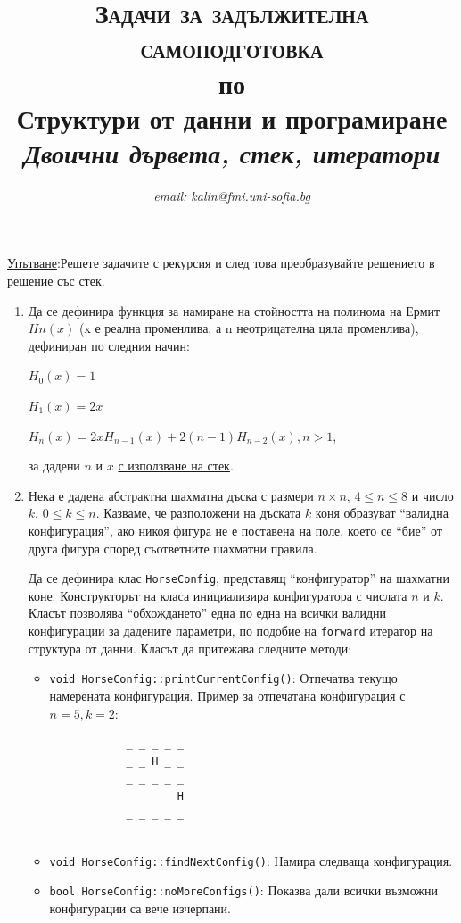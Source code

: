 \documentclass[12pt,a4paper]{article}
\author{\textit{email: kalin@fmi.uni-sofia.bg}}
\title{\textsc{Задачи за задължителна самоподготовка} \\
по \\
Структури от данни и програмиране\\
\textit{Двоични дървета, стек, итератори}}
\begin{document}
\maketitle

 \underline{Упътване}:Решете задачите с рекурсия и след това преобразувайте решението в решение със стек.



\begin{enumerate}

	\item Да се дефинира функция за намиране на стойността на полинома на Ермит $Hn(x)$ (x е реална променлива, а n неотрицателна цяла променлива), дефиниран по следния начин:

	$H_0(x)=1$

	$H_1(x)=2x$

	$H_n(x)=2xH_{n-1}(x)+2(n-1)H_{n-2}(x), n>1$,

	за дадени $n$ и $x$ \underline{с използване на стек}.


	\item Нека е дадена абстрактна шахматна дъска с размери $n \times n$, $4 \le n \le 8$ и число $k$, $0 \le k \le n$. Казваме, че разположени на дъската  $k$ коня образуват ``валидна конфигурация'', ако никоя фигура не е поставена на поле, което се ``бие'' от друга фигура според съответните шахматни правила. 

	Да се дефинира клас \texttt{HorseConfig}, представящ ``конфигуратор'' на шахматни коне. Конструкторът на класа инициализира конфигуратора с числата $n$ и $k$. Класът позволява ``обхождането'' една по една на всички валидни конфигурации за дадените параметри, по подобие на \texttt{forward} итератор на структура от данни. Класът да притежава следните методи:

	\begin{itemize}
		\item \texttt{void HorseConfig::printCurrentConfig()}: Отпечатва текущо намерената конфигурация.
			Пример за отпечатана конфигурация с $n=5, k=2$:
			\begin{verbatim}
			_ _ _ _ _
			_ _ H _ _
			_ _ _ _ _
			_ _ _ _ H
			_ _ _ _ _
				
			\end{verbatim}		
		\item \texttt{void HorseConfig::findNextConfig()}: Намира следваща конфигурация.
		\item \texttt{bool HorseConfig::noMoreConfigs()}: Показва дали всички възможни конфигурации са вече изчерпани.
	\end{itemize}



\end{enumerate}
\end{document}
